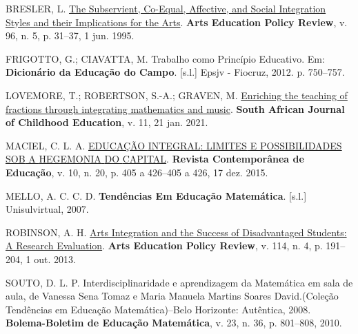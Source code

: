 \documentclass[
  letterpaper,
  DIV=11,
  numbers=noendperiod]{scrreprt}
\newlength{\cslhangindent}
\newenvironment{CSLReferences}[2] %
 {\begin{list}{}{%
  \setlength{\itemindent}{0pt}
  \setlength{\leftmargin}{0pt}
  \setlength{\parsep}{0pt}
  \ifodd #1
   \setlength{\leftmargin}{\cslhangindent}
   \setlength{\itemindent}{-1\cslhangindent}
  \fi
  \setlength{\itemsep}{#2\baselineskip}}}
 {\end{list}}
\begin{document}
\label{refs}
\begin{CSLReferences}{0}{1}
BRESLER, L. \href{https://doi.org/10.1080/10632913.1995.9934564}{The
Subservient, Co-Equal, Affective, and Social Integration Styles and
their Implications for the Arts}. \textbf{Arts Education Policy Review},
v. 96, n. 5, p. 31--37, 1 jun. 1995.

FRIGOTTO, G.; CIAVATTA, M. Trabalho como Princípio Educativo. Em:
\textbf{Dicionário da Educação do Campo}. {[}s.l.{]} Epsjv - Fiocruz,
2012. p. 750--757.

LOVEMORE, T.; ROBERTSON, S.-A.; GRAVEN, M.
\href{https://doi.org/10.4102/sajce.v11i1.899}{Enriching the teaching of
fractions through integrating mathematics and music}. \textbf{South
African Journal of Childhood Education}, v. 11, 21 jan. 2021.

MACIEL, C. L. A.
\href{https://doi.org/10.20500/rce.v10i20.2220}{{EDUCAÇÃO} {INTEGRAL}:
{LIMITES} E {POSSIBILIDADES} {SOB} A {HEGEMONIA} {DO} {CAPITAL}}.
\textbf{Revista Contemporânea de Educação}, v. 10, n. 20, p. 405 a
426--405 a 426, 17 dez. 2015.

MELLO, A. C. C. D. \textbf{Tendências Em Educação Matemática}.
{[}s.l.{]} Unisulvirtual, 2007.

ROBINSON, A. H. \href{https://doi.org/10.1080/10632913.2013.826050}{Arts
Integration and the Success of Disadvantaged Students: A Research
Evaluation}. \textbf{Arts Education Policy Review}, v. 114, n. 4, p.
191--204, 1 out. 2013.

SOUTO, D. L. P. Interdisciplinaridade e aprendizagem da Matemática em
sala de aula, de Vanessa Sena Tomaz e Maria Manuela Martins Soares
David.(Coleção Tendências em Educação Matemática)--Belo Horizonte:
Autêntica, 2008. \textbf{Bolema-Boletim de Educação Matemática}, v. 23,
n. 36, p. 801--808, 2010.

\end{CSLReferences}
\end{document}
